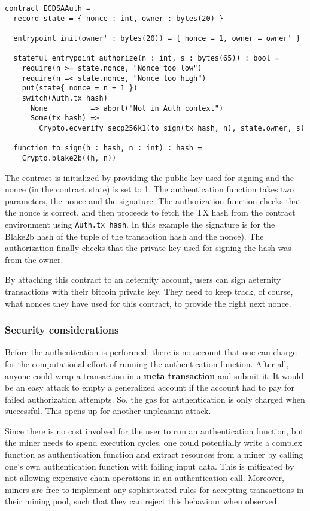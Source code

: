 \begin{verbatim}
contract ECDSAAuth =
  record state = { nonce : int, owner : bytes(20) }

  entrypoint init(owner' : bytes(20)) = { nonce = 1, owner = owner' }

  stateful entrypoint authorize(n : int, s : bytes(65)) : bool =
    require(n >= state.nonce, "Nonce too low")
    require(n =< state.nonce, "Nonce too high")
    put(state{ nonce = n + 1 })
    switch(Auth.tx_hash)
      None          => abort("Not in Auth context")
      Some(tx_hash) =>
        Crypto.ecverify_secp256k1(to_sign(tx_hash, n), state.owner, s)

  function to_sign(h : hash, n : int) : hash =
    Crypto.blake2b((h, n))

\end{verbatim}

The contract is initialized by providing the public key used for
signing and the nonce (in the contract state) is set to 1. The
authentication function takes two parameters, the nonce and the signature.
The authorization function checks that the nonce is correct, and then
proceeds to fetch the TX hash from the contract environment using
\verb+Auth.tx_hash+. In this example the signature is for the Blake2b
hash of the tuple of the transaction hash and the nonce). The
authorization finally checks that the private key used for signing the
hash was from the owner.


By attaching this contract to an aeternity account, users can sign
aeternity transactions with their bitcoin private key. They need to
keep track, of course, what nonces they have used for this contract,
to provide the right next nonce.

\subsubsection{Security considerations}

Before the authentication is performed, there is no account that one
can charge for the computational effort of running the authentication
function. After all, anyone could wrap a transaction in a \textbf{meta
  transaction} and submit it. It would be an easy attack to empty a
generalized account if the account had to pay for failed authorization
attempts. So, the gas for authentication is only charged when
successful. This opens up for another unpleasant attack.

Since there is no cost involved for the user to run an authentication
function, but the miner needs to spend execution cycles, one could
potentially write a complex function as authentication function and
extract resources from a miner by calling one's own authentication
function with failing input data. This is mitigated by not allowing
expensive chain operations in an authentication call. Moreover, miners
are free to implement any sophisticated rules for accepting
transactions in their mining pool, such that they can reject this
behaviour when observed.


